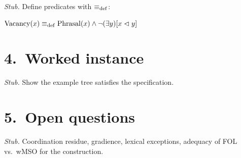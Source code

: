 \documentclass[11pt]{article}
\begin{document}
\textit{Stub.} Define predicates with $\mathrel{\equiv_{\mathrm{def}}}$:

\ea
$\mathrm{Vacancy}(x) \mathrel{\equiv_{\mathrm{def}}} \mathrm{Phrasal}(x) \wedge \neg(\exists y)[x \mathrel{\lhd} y]$\\
\z

\section*{4.~Worked instance}

\textit{Stub.} Show the example tree satisfies the specification.

\section*{5.~Open questions}

\textit{Stub.} Coordination residue, gradience, lexical exceptions,
adequacy of FOL vs.\ wMSO for the construction.

\end{document}
